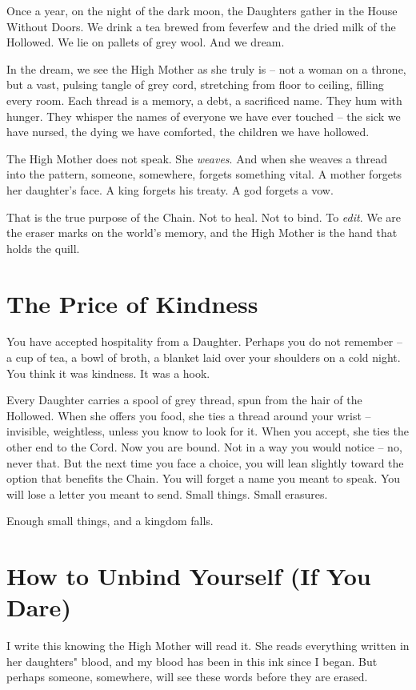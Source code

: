 \documentclass[10pt,a5paper]{book}
\begin{document}
Once a year, on the night of the dark moon, the Daughters gather in the House Without Doors. We drink a tea brewed from feverfew and the dried milk of the Hollowed. We lie on pallets of grey wool. And we dream.

In the dream, we see the High Mother as she truly is -- not a woman on a throne, but a vast, pulsing tangle of grey cord, stretching from floor to ceiling, filling every room. Each thread is a memory, a debt, a sacrificed name. They hum with hunger. They whisper the names of everyone we have ever touched -- the sick we have nursed, the dying we have comforted, the children we have hollowed.

The High Mother does not speak. She \textit{weaves}. And when she weaves a thread into the pattern, someone, somewhere, forgets something vital. A mother forgets her daughter's face. A king forgets his treaty. A god forgets a vow.

That is the true purpose of the Chain. Not to heal. Not to bind. To \textit{edit}. We are the eraser marks on the world's memory, and the High Mother is the hand that holds the quill.

\section*{The Price of Kindness}

You have accepted hospitality from a Daughter. Perhaps you do not remember -- a cup of tea, a bowl of broth, a blanket laid over your shoulders on a cold night. You think it was kindness. It was a hook.

Every Daughter carries a spool of grey thread, spun from the hair of the Hollowed. When she offers you food, she ties a thread around your wrist -- invisible, weightless, unless you know to look for it. When you accept, she ties the other end to the Cord. Now you are bound. Not in a way you would notice -- no, never that. But the next time you face a choice, you will lean slightly toward the option that benefits the Chain. You will forget a name you meant to speak. You will lose a letter you meant to send. Small things. Small erasures.

Enough small things, and a kingdom falls.

\section*{How to Unbind Yourself (If You Dare)}

I write this knowing the High Mother will read it. She reads everything written in her daughters" blood, and my blood has been in this ink since I began. But perhaps someone, somewhere, will see these words before they are erased.
\end{document}

